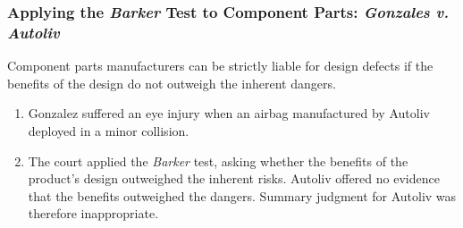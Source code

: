 \subsubsection{Applying the \emph{Barker} Test to Component Parts: 
\emph{Gonzales v. Autoliv}}

Component parts manufacturers can be strictly liable for design defects if the 
benefits of the design do not outweigh the inherent dangers.

\begin{enumerate}
    \item Gonzalez suffered an eye injury when an airbag manufactured by 
    Autoliv deployed in a minor collision.
    \item The court applied the \emph{Barker} test, asking whether the 
    benefits of the product's design outweighed the inherent risks. Autoliv 
    offered no evidence that the benefits outweighed the dangers. Summary 
    judgment for Autoliv was therefore inappropriate.
\end{enumerate}

